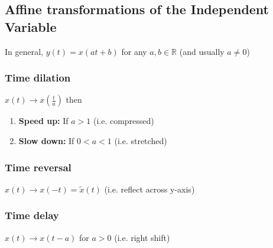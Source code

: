\subsection{Affine transformations of the Independent Variable}
    In general, $y(t) = x(at+b)$ for any $a,b \in \mathbb{R}$ (and usually $a \neq 0$)
    \subsubsection{Time dilation}
    \begin{definition}
        $x(t) \rightarrow x\left(\frac{t}{a}\right)$ then 
        \begin{enumerate}
            \item \textbf{Speed up:} If $a > 1$ (i.e. compressed)
            \item \textbf{Slow down:} If $0<a<1$ (i.e. stretched)
        \end{enumerate}
    \end{definition}

    \begin{example}
    \end{example}

    \subsubsection{Time reversal}
    \begin{definition}
        $x(t)\rightarrow x(-t) = \tilde{x}(t)$ (i.e. reflect across y-axis)
    \end{definition}

    \begin{example}
    \end{example}

    \subsubsection{Time delay}
    \begin{definition}
        $x(t) \rightarrow x(t - a)$ for $a>0$ (i.e. right shift)
    \end{definition}

    \begin{example}
    \end{example}

